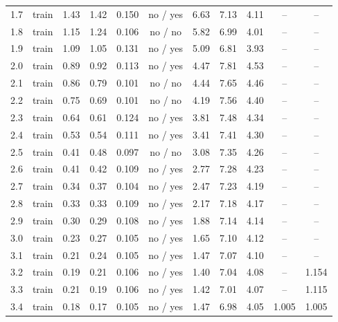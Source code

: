 {\begin{longtable}{llccccccccc}
\rule[-3pt]{0pt}{11.5pt} 1.7 & train & 1.43 & 1.42 & 0.150 & no / yes & 6.63 & 7.13 & 4.11 & -- & -- \\
\rule[-3pt]{0pt}{11.5pt} 1.8 & train & 1.15 & 1.24 & 0.106 & no / no & 5.82 & 6.99 & 4.01 & -- & -- \\
\rule[-3pt]{0pt}{11.5pt} 1.9 & train & 1.09 & 1.05 & 0.131 & no / yes & 5.09 & 6.81 & 3.93 & -- & -- \\
\rule[-3pt]{0pt}{11.5pt} 2.0 & train & 0.89 & 0.92 & 0.113 & no / yes & 4.47 & 7.81 & 4.53 & -- & -- \\
\rule[-3pt]{0pt}{11.5pt} 2.1 & train & 0.86 & 0.79 & 0.101 & no / no & 4.44 & 7.65 & 4.46 & -- & -- \\
\rule[-3pt]{0pt}{11.5pt} 2.2 & train & 0.75 & 0.69 & 0.101 & no / no & 4.19 & 7.56 & 4.40 & -- & -- \\
\rule[-3pt]{0pt}{11.5pt} 2.3 & train & 0.64 & 0.61 & 0.124 & no / yes & 3.81 & 7.48 & 4.34 & -- & -- \\
\rule[-3pt]{0pt}{11.5pt} 2.4 & train & 0.53 & 0.54 & 0.111 & no / yes & 3.41 & 7.41 & 4.30 & -- & -- \\
\rule[-3pt]{0pt}{11.5pt} 2.5 & train & 0.41 & 0.48 & 0.097 & no / no & 3.08 & 7.35 & 4.26 & -- & -- \\
\rule[-3pt]{0pt}{11.5pt} 2.6 & train & 0.41 & 0.42 & 0.109 & no / yes & 2.77 & 7.28 & 4.23 & -- & -- \\
\rule[-3pt]{0pt}{11.5pt} 2.7 & train & 0.34 & 0.37 & 0.104 & no / yes & 2.47 & 7.23 & 4.19 & -- & -- \\
\rule[-3pt]{0pt}{11.5pt} 2.8 & train & 0.33 & 0.33 & 0.109 & no / yes & 2.17 & 7.18 & 4.17 & -- & -- \\
\rule[-3pt]{0pt}{11.5pt} 2.9 & train & 0.30 & 0.29 & 0.108 & no / yes & 1.88 & 7.14 & 4.14 & -- & -- \\
\rule[-3pt]{0pt}{11.5pt} 3.0 & train & 0.23 & 0.27 & 0.105 & no / yes & 1.65 & 7.10 & 4.12 & -- & -- \\
\rule[-3pt]{0pt}{11.5pt} 3.1 & train & 0.21 & 0.24 & 0.105 & no / yes & 1.47 & 7.07 & 4.10 & -- & -- \\
\rule[-3pt]{0pt}{11.5pt} 3.2 & train & 0.19 & 0.21 & 0.106 & no / yes & 1.40 & 7.04 & 4.08 & -- & 1.154 \\
\rule[-3pt]{0pt}{11.5pt} 3.3 & train & 0.21 & 0.19 & 0.106 & no / yes & 1.42 & 7.01 & 4.07 & -- & 1.115 \\
\rule[-3pt]{0pt}{11.5pt} 3.4 & train & 0.18 & 0.17 & 0.105 & no / yes & 1.47 & 6.98 & 4.05 & 1.005 & 1.005 \\

\end{longtable}}
